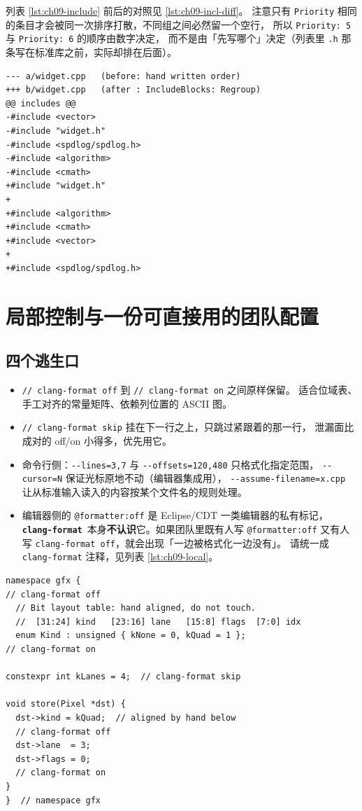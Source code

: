 \documentclass[12pt,a4paper,fontset=fandol]{ctexbook}
\newcommand{\Opt}[1]{\texttt{-\/-#1}}
\newcommand{\Lib}[1]{\textbf{\texttt{#1}}}
\newcommand{\Fmt}{\Lib{clang-format}}
\begin{document}
列表 \ref{lst:ch09-include} 前后的对照见 \ref{lst:ch09-incl-diff}。
注意只有 \texttt{Priority} 相同的条目才会被同一次排序打散，不同组之间必然留一个空行，
所以 \texttt{Priority: 5} 与 \texttt{Priority: 6} 的顺序由数字决定，
而不是由「先写哪个」决定（列表里 \texttt{.h} 那条写在标准库之前，实际却排在后面）。

\begin{lstlisting}[style=diffstyle,caption={同一个翻译单元应用 include 排序配置后的差异},label={lst:ch09-incl-diff}]
--- a/widget.cpp   (before: hand written order)
+++ b/widget.cpp   (after : IncludeBlocks: Regroup)
@@ includes @@
-#include <vector>
-#include "widget.h"
-#include <spdlog/spdlog.h>
-#include <algorithm>
-#include <cmath>
+#include "widget.h"
+
+#include <algorithm>
+#include <cmath>
+#include <vector>
+
+#include <spdlog/spdlog.h>
\end{lstlisting}

\section{局部控制与一份可直接用的团队配置}\label{sec:ch09-s6}

\subsection{四个逃生口}\label{sec:ch09-s6-local}

\begin{itemize}
  \item \texttt{// clang-format off} 到 \texttt{// clang-format on} 之间原样保留。
    适合位域表、手工对齐的常量矩阵、依赖列位置的 ASCII 图。
  \item \texttt{// clang-format skip} 挂在下一行之上，只跳过紧跟着的那一行，
    泄漏面比成对的 off/on 小得多，优先用它。
  \item 命令行侧：\Opt{lines=3,7} 与 \Opt{offsets=120,480} 只格式化指定范围，
    \Opt{cursor=N} 保证光标原地不动（编辑器集成用），
    \Opt{assume-filename=x.cpp} 让从标准输入读入的内容按某个文件名的规则处理。
  \item 编辑器侧的 \texttt{@formatter:off} 是 Eclipse/CDT 一类编辑器的私有标记，
    \Fmt\ 本身\textbf{不认识}它。如果团队里既有人写 \texttt{@formatter:off}
    又有人写 \texttt{clang-format off}，就会出现「一边被格式化一边没有」。
    请统一成 \texttt{clang-format} 注释，见列表 \ref{lst:ch09-local}。
\end{itemize}

\begin{lstlisting}[style=cppstyle,caption={三种局部控制写法的落位},label={lst:ch09-local}]
namespace gfx {
// clang-format off
  // Bit layout table: hand aligned, do not touch.
  //  [31:24] kind   [23:16] lane   [15:8] flags  [7:0] idx
  enum Kind : unsigned { kNone = 0, kQuad = 1 };
// clang-format on

constexpr int kLanes = 4;  // clang-format skip

void store(Pixel *dst) {
  dst->kind = kQuad;  // aligned by hand below
  // clang-format off
  dst->lane  = 3;
  dst->flags = 0;
  // clang-format on
}
}  // namespace gfx
\end{lstlisting}
\end{document}
